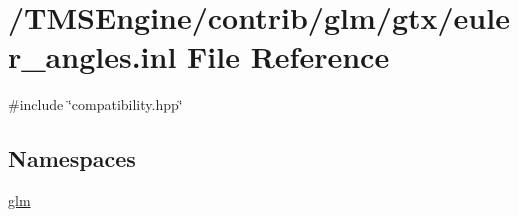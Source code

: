 \hypertarget{euler__angles_8inl}{}\section{/\+T\+M\+S\+Engine/contrib/glm/gtx/euler\+\_\+angles.inl File Reference}
\label{euler__angles_8inl}
{\ttfamily \#include \char`\"{}compatibility.\+hpp\char`\"{}}\newline
\subsection*{Namespaces}
\begin{DoxyCompactItemize}
\item 
 \hyperlink{namespaceglm}{glm}
\end{DoxyCompactItemize}
